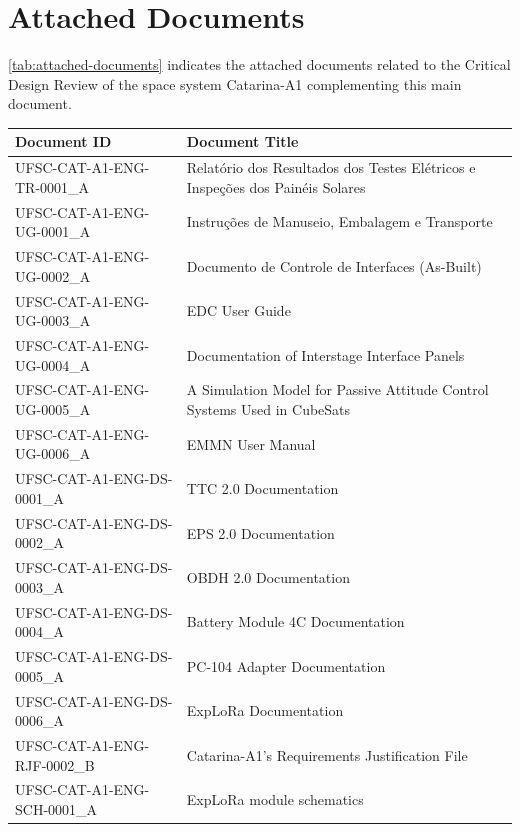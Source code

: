 \chapter*{Attached Documents}


 \autoref{tab:attached-documents} indicates the attached documents related to the Critical Design Review of the space system Catarina-A1 complementing this main document.

\begin{table}[H]\footnotesize
    \centering
    \begin{tabular}{lp{10cm}}
        \toprule[1.5pt]
        \textbf{Document ID} & \textbf{Document Title} \\
        \midrule
        UFSC-CAT-A1-ENG-TR-0001\_A  & Relatório dos Resultados dos Testes Elétricos e Inspeções dos Painéis Solares \\ 
        UFSC-CAT-A1-ENG-UG-0001\_A  & Instruções de Manuseio, Embalagem e Transporte \\ 
        UFSC-CAT-A1-ENG-UG-0002\_A  & Documento de Controle de Interfaces (As-Built) \\
        UFSC-CAT-A1-ENG-UG-0003\_A  & EDC User Guide \\ 
        UFSC-CAT-A1-ENG-UG-0004\_A  & Documentation of Interstage Interface Panels \\ 
        UFSC-CAT-A1-ENG-UG-0005\_A  & A Simulation Model for Passive Attitude Control Systems Used in CubeSats \\ 
        UFSC-CAT-A1-ENG-UG-0006\_A  & EMMN User Manual \\
        UFSC-CAT-A1-ENG-DS-0001\_A  & TTC 2.0 Documentation \\ 
        UFSC-CAT-A1-ENG-DS-0002\_A  & EPS 2.0 Documentation \\ 
        UFSC-CAT-A1-ENG-DS-0003\_A  & OBDH 2.0 Documentation \\ 
        UFSC-CAT-A1-ENG-DS-0004\_A  & Battery Module 4C Documentation \\ 
        UFSC-CAT-A1-ENG-DS-0005\_A  & PC-104 Adapter Documentation \\ 
        UFSC-CAT-A1-ENG-DS-0006\_A  & ExpLoRa Documentation \\
        UFSC-CAT-A1-ENG-RJF-0002\_B & Catarina-A1's Requirements Justification File \\
        UFSC-CAT-A1-ENG-SCH-0001\_A & ExpLoRa module schematics \\

\end{tabular}
\end{table}
